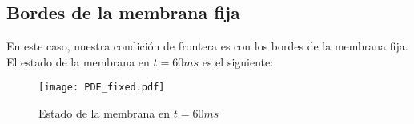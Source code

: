 \documentclass{article}
\begin{document}
	\subsection{Bordes de la membrana fija}
	En este caso, nuestra condición de frontera es con los bordes de la membrana fija. El estado de la membrana en $t=60ms$ es el siguiente:
	\begin{figure}[H]
		\centering
		\texttt{[image: PDE\_fixed.pdf]}
		\caption{Estado de la membrana en $t=60ms$}
		\label{fig:pdefixed}
	\end{figure}
	
\end{document}
